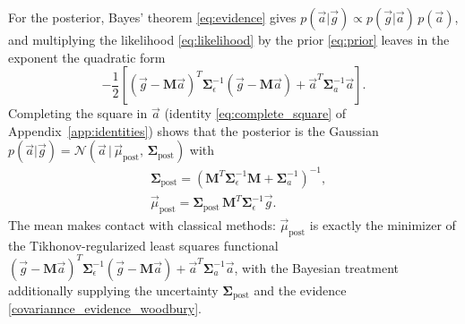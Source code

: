 \documentclass{article}
\begin{document}
For the posterior, Bayes' theorem \eqref{eq:evidence} gives $p(\vec a|\vec g) \propto p(\vec g|\vec a)\,p(\vec a)$, and multiplying the likelihood \eqref{eq:likelihood} by the prior \eqref{eq:prior} leaves in the exponent the quadratic form
\begin{equation}
    -\frac{1}{2}\left[(\vec g - \mathbf M\vec a)^T\mathbf{\Sigma}_\epsilon^{-1}(\vec g - \mathbf M\vec a) + \vec a^T\mathbf{\Sigma}_a^{-1}\vec a\right].
\end{equation}
Completing the square in $\vec a$ (identity \eqref{eq:complete_square} of Appendix~\ref{app:identities}) shows that the posterior is the Gaussian $p(\vec a|\vec g) = \mathcal N(\vec a\,|\,\vec\mu_{\text{post}},\, \mathbf{\Sigma}_{\text{post}})$ with
\begin{align}
    &\mathbf{\Sigma}_{\text{post}} = (\mathbf{M}^T \mathbf{\Sigma}_\epsilon^{-1} \mathbf{M} + \mathbf{\Sigma}_a^{-1})^{-1}, \label{eq:posterior_covariance}\\
    &\vec{\mu}_{\text{post}} = \mathbf{\Sigma}_{\text{post}}\,\mathbf{M}^T \mathbf{\Sigma}_\epsilon^{-1}\vec{g}. \label{eq:posterior_mean}
\end{align}
The mean makes contact with classical methods: $\vec\mu_{\text{post}}$ is exactly the minimizer of the Tikhonov-regularized least squares functional $(\vec g - \mathbf M \vec a)^T\mathbf{\Sigma}_\epsilon^{-1}(\vec g - \mathbf M \vec a) + \vec a^T \mathbf{\Sigma}_a^{-1}\vec a$, with the Bayesian treatment additionally supplying the uncertainty $\mathbf{\Sigma}_{\text{post}}$ and the evidence \eqref{covariannce_evidence_woodbury}.
\end{document}
